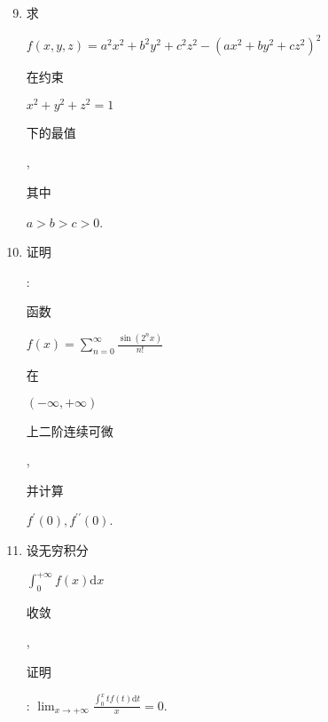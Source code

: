 \documentclass[10pt]{article}
\begin{document}
\begin{enumerate}
  \setcounter{enumi}{8}
  \item \begin{CJK}{UTF8}{mj}求\end{CJK} $f(x, y, z)=a^{2} x^{2}+b^{2} y^{2}+c^{2} z^{2}-\left(a x^{2}+b y^{2}+c z^{2}\right)^{2}$ \begin{CJK}{UTF8}{mj}在约束\end{CJK} $x^{2}+y^{2}+z^{2}=1$ \begin{CJK}{UTF8}{mj}下的最值\end{CJK}, \begin{CJK}{UTF8}{mj}其中\end{CJK} $a>b>c>0$.

  \item \begin{CJK}{UTF8}{mj}证明\end{CJK}: \begin{CJK}{UTF8}{mj}函数\end{CJK} $f(x)=\sum_{n=0}^{\infty} \frac{\sin \left(2^{n} x\right)}{n !}$ \begin{CJK}{UTF8}{mj}在\end{CJK} $(-\infty,+\infty)$ \begin{CJK}{UTF8}{mj}上二阶连续可微\end{CJK}, \begin{CJK}{UTF8}{mj}并计算\end{CJK} $f^{\prime}(0), f^{\prime \prime}(0)$.

  \item \begin{CJK}{UTF8}{mj}设无穷积分\end{CJK} $\int_{0}^{+\infty} f(x) \mathrm{d} x$ \begin{CJK}{UTF8}{mj}收敛\end{CJK}, \begin{CJK}{UTF8}{mj}证明\end{CJK}: $\lim _{x \rightarrow+\infty} \frac{\int_{0}^{x} t f(t) \mathrm{d} t}{x}=0$.

\end{enumerate}
\end{document}
